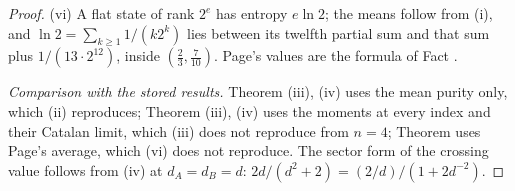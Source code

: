 \begin{proof}
(vi) A flat state of rank $2^{e}$ has entropy $e\ln 2$; the means follow from (i), and $\ln 2 = \sum_{k \ge 1}1/(k2^{k})$ lies between its twelfth partial sum and that sum plus $1/(13 \cdot 2^{12})$, inside $(\tfrac23, \tfrac{7}{10})$. Page's values are the formula of Fact .

\emph{Comparison with the stored results.} Theorem (iii), (iv) uses the mean purity only, which (ii) reproduces; Theorem (iii), (iv) uses the moments at every index and their Catalan limit, which (iii) does not reproduce from $n = 4$; Theorem  uses Page's average, which (vi) does not reproduce. The sector form of the crossing value follows from (iv) at $d_{A} = d_{B} = d$: $2d/(d^{2} + 2) = (2/d)/(1 + 2d^{-2})$.
\end{proof}
